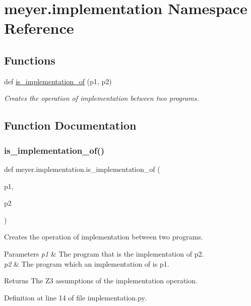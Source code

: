 \hypertarget{namespacemeyer_1_1implementation}{}\section{meyer.\+implementation Namespace Reference}
\label{namespacemeyer_1_1implementation}
\subsection*{Functions}
\begin{DoxyCompactItemize}
\item 
def \hyperlink{namespacemeyer_1_1implementation_abb58ac5f26d584029cf2b770144d8c80}{is\+\_\+implementation\+\_\+of} (p1, p2)
\begin{DoxyCompactList}\small\item\em Creates the operation of implementation between two programs. \end{DoxyCompactList}\end{DoxyCompactItemize}


\subsection{Function Documentation}
\mbox{\label{namespacemeyer_1_1implementation_abb58ac5f26d584029cf2b770144d8c80}} 
\subsubsection{\texorpdfstring{is\+\_\+implementation\+\_\+of()}{is\_implementation\_of()}}
{\footnotesize\ttfamily def meyer.\+implementation.\+is\+\_\+implementation\+\_\+of (\begin{DoxyParamCaption}\item[{}]{p1,  }\item[{}]{p2 }\end{DoxyParamCaption})}



Creates the operation of implementation between two programs. 


\begin{DoxyParams}{Parameters}
{\em p1} & The program that is the implementation of p2. \\
\hline
{\em p2} & The program which an implementation of is p1. \\
\hline
\end{DoxyParams}
\begin{DoxyReturn}{Returns}
The Z3 assumptions of the implementation operation. 
\end{DoxyReturn}


Definition at line 14 of file implementation.\+py.

